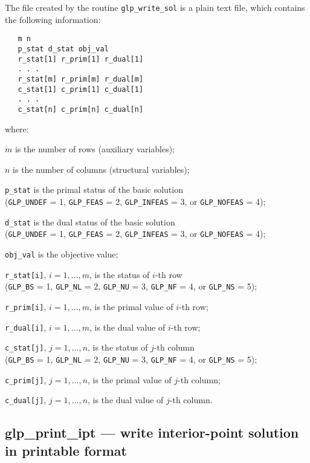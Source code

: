 \newpage


The file created by the routine \verb|glp_write_sol| is a plain text
file, which contains the following information:

\begin{verbatim}
   m n
   p_stat d_stat obj_val
   r_stat[1] r_prim[1] r_dual[1]
   . . .
   r_stat[m] r_prim[m] r_dual[m]
   c_stat[1] c_prim[1] c_dual[1]
   . . .
   c_stat[n] c_prim[n] c_dual[n]
\end{verbatim}

\noindent
where:

\noindent
$m$ is the number of rows (auxiliary variables);

\noindent
$n$ is the number of columns (structural variables);

\noindent
\verb|p_stat| is the primal status of the basic solution\\
(\verb|GLP_UNDEF| = 1, \verb|GLP_FEAS| = 2, \verb|GLP_INFEAS| = 3, or
\verb|GLP_NOFEAS| = 4);

\noindent
\verb|d_stat| is the dual status of the basic solution\\
(\verb|GLP_UNDEF| = 1, \verb|GLP_FEAS| = 2, \verb|GLP_INFEAS| = 3, or
\verb|GLP_NOFEAS| = 4);

\noindent
\verb|obj_val| is the objective value;

\noindent
\verb|r_stat[i]|, $i=1,\dots,m$, is the status of $i$-th row\\
(\verb|GLP_BS| = 1, \verb|GLP_NL| = 2, \verb|GLP_NU| = 3,
\verb|GLP_NF| = 4, or \verb|GLP_NS| = 5);

\noindent
\verb|r_prim[i]|, $i=1,\dots,m$, is the primal value of $i$-th row;

\noindent
\verb|r_dual[i]|, $i=1,\dots,m$, is the dual value of $i$-th row;

\noindent
\verb|c_stat[j]|, $j=1,\dots,n$, is the status of $j$-th column\\
(\verb|GLP_BS| = 1, \verb|GLP_NL| = 2, \verb|GLP_NU| = 3,
\verb|GLP_NF| = 4, or \verb|GLP_NS| = 5);

\noindent
\verb|c_prim[j]|, $j=1,\dots,n$, is the primal value of $j$-th column;

\noindent
\verb|c_dual[j]|, $j=1,\dots,n$, is the dual value of $j$-th column.

\subsection{glp\_print\_ipt --- write interior-point solution in
printable format}

